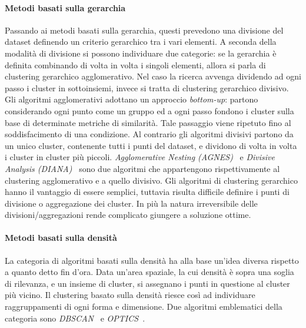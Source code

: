 \paragraph{Metodi basati sulla gerarchia}
Passando ai metodi basati sulla gerarchia, questi prevedono una divisione del dataset definendo un criterio gerarchico tra i vari elementi.
A seconda della modalità di divisione si possono individuare due categorie: se la gerarchia è definita combinando di volta in volta i singoli elementi,
allora si parla di clustering gerarchico agglomerativo.
Nel caso la ricerca avvenga dividendo ad ogni passo i cluster in sottoinsiemi, invece
si tratta di clustering gerarchico divisivo.
Gli algoritmi agglomerativi adottano un approccio \textit{bottom-up}: partono considerando ogni punto come un gruppo ed a ogni passo fondono i cluster sulla base di determinate metriche
di similarità. Tale passaggio viene ripetuto fino al soddisfacimento di una condizione.
Al contrario gli algoritmi divisivi partono da un unico cluster, contenente tutti i punti del dataset, e dividono di volta
in volta i cluster in cluster più piccoli.
\textit{Agglomerative Nesting (AGNES)}~\cite{kaufman2008agglomerative} e \textit{Divisive Analysis (DIANA)}~\cite{kaufman2008divisive} sono due algoritmi che
appartengono rispettivamente al clustering agglomerativo e a quello divisivo.
Gli algoritmi di clustering gerarchico hanno il vantaggio di essere semplici, tuttavia risulta
difficile definire i punti di divisione o aggregazione dei cluster.
In più la natura irreversibile delle divisioni/aggregazioni rende complicato giungere a soluzione ottime.

\paragraph{Metodi basati sulla densità}
La categoria di algoritmi basati sulla densità ha alla base un'idea diversa rispetto a quanto detto fin d'ora.
Data un'area spaziale, la cui densità è sopra una soglia di rilevanza, e un insieme di cluster, si assegnano i punti in questione al cluster più vicino.
Il clustering basato sulla densità riesce così ad individuare raggruppamenti di ogni forma e dimensione.
Due algoritmi emblematici della categoria sono \textit{DBSCAN}~\cite{ester1996density} e \textit{OPTICS}~\cite{ankerst1999optics}.

